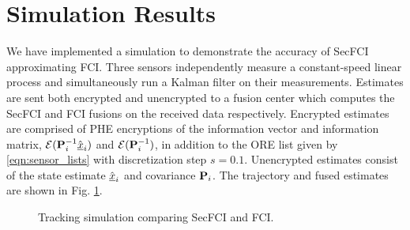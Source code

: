 \documentclass[letterpaper, 10 pt, journal, twoside]{ieeetran}  %
\begin{document}
\section{Simulation Results} \label{sec:results}
We have implemented a simulation to demonstrate the accuracy of SecFCI approximating FCI. Three sensors independently measure a constant-speed linear process and simultaneously run a Kalman filter on their measurements. Estimates are sent both encrypted and unencrypted to a fusion center which computes the SecFCI and FCI fusions on the received data respectively. Encrypted estimates are comprised of PHE encryptions of the information vector and information matrix, $\mathcal{E}({{\mathbf{P}}}^{-1}_i\hat{{\underline{x}}}_i)$ and $\mathcal{E}({{\mathbf{P}}}^{-1}_i)$, in addition to the ORE list given by \eqref{eqn:sensor_lists} with discretization step $s=0.1$. Unencrypted estimates consist of the state estimate $\hat{{\underline{x}}}_i$ and covariance ${{\mathbf{P}}}_i$. The trajectory and fused estimates are shown in Fig. \ref{fig:fci_secfci_traj}.
\begin{figure}[tb]
   \vspace{-10pt}
   \begin{center}
      
   \end{center}
   \vspace{-15pt}
   \caption{Tracking simulation comparing SecFCI and FCI.}
   \vspace{-\baselineskip}
   \label{fig:fci_secfci_traj}
\end{figure}
\end{document}

